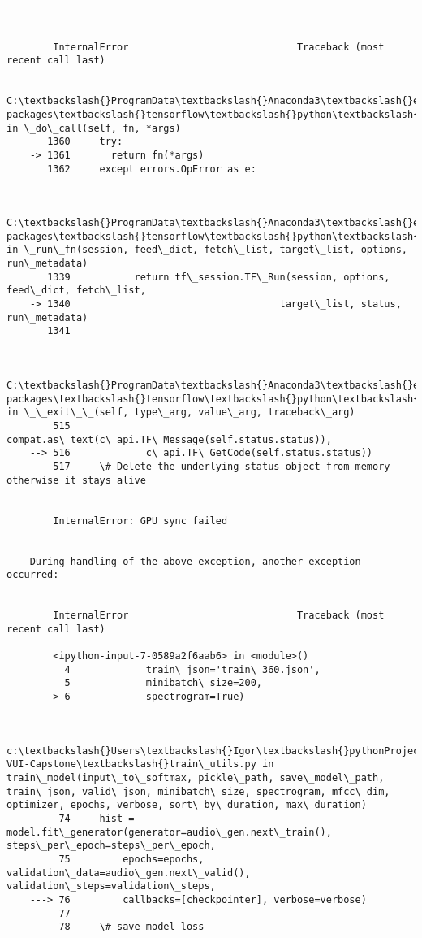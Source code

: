 \documentclass[11pt]{article}
\begin{document}
    \begin{Verbatim}[commandchars=\\\{\}]

        ---------------------------------------------------------------------------

        InternalError                             Traceback (most recent call last)

        C:\textbackslash{}ProgramData\textbackslash{}Anaconda3\textbackslash{}envs\textbackslash{}nbkeras\textbackslash{}lib\textbackslash{}site-packages\textbackslash{}tensorflow\textbackslash{}python\textbackslash{}client\textbackslash{}session.py in \_do\_call(self, fn, *args)
       1360     try:
    -> 1361       return fn(*args)
       1362     except errors.OpError as e:
    

        C:\textbackslash{}ProgramData\textbackslash{}Anaconda3\textbackslash{}envs\textbackslash{}nbkeras\textbackslash{}lib\textbackslash{}site-packages\textbackslash{}tensorflow\textbackslash{}python\textbackslash{}client\textbackslash{}session.py in \_run\_fn(session, feed\_dict, fetch\_list, target\_list, options, run\_metadata)
       1339           return tf\_session.TF\_Run(session, options, feed\_dict, fetch\_list,
    -> 1340                                    target\_list, status, run\_metadata)
       1341 
    

        C:\textbackslash{}ProgramData\textbackslash{}Anaconda3\textbackslash{}envs\textbackslash{}nbkeras\textbackslash{}lib\textbackslash{}site-packages\textbackslash{}tensorflow\textbackslash{}python\textbackslash{}framework\textbackslash{}errors\_impl.py in \_\_exit\_\_(self, type\_arg, value\_arg, traceback\_arg)
        515             compat.as\_text(c\_api.TF\_Message(self.status.status)),
    --> 516             c\_api.TF\_GetCode(self.status.status))
        517     \# Delete the underlying status object from memory otherwise it stays alive
    

        InternalError: GPU sync failed

        
    During handling of the above exception, another exception occurred:
    

        InternalError                             Traceback (most recent call last)

        <ipython-input-7-0589a2f6aab6> in <module>()
          4             train\_json='train\_360.json',
          5             minibatch\_size=200,
    ----> 6             spectrogram=True)
    

        c:\textbackslash{}Users\textbackslash{}Igor\textbackslash{}pythonProjects\textbackslash{}nano\textbackslash{}AIND-VUI-Capstone\textbackslash{}train\_utils.py in train\_model(input\_to\_softmax, pickle\_path, save\_model\_path, train\_json, valid\_json, minibatch\_size, spectrogram, mfcc\_dim, optimizer, epochs, verbose, sort\_by\_duration, max\_duration)
         74     hist = model.fit\_generator(generator=audio\_gen.next\_train(), steps\_per\_epoch=steps\_per\_epoch,
         75         epochs=epochs, validation\_data=audio\_gen.next\_valid(), validation\_steps=validation\_steps,
    ---> 76         callbacks=[checkpointer], verbose=verbose)
         77 
         78     \# save model loss
    


\end{Verbatim}
\end{document}

